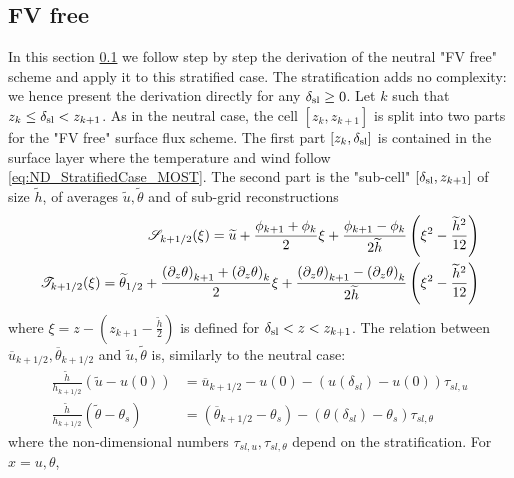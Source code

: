 \subsection{FV free}
\label{sec:ND_StratifiedCase_FVfree}
In this section \ref{sec:ND_StratifiedCase_FVfree} we follow
step by step the derivation of the neutral "FV free" scheme and
apply it to this stratified case. The stratification adds no
complexity: we hence present the derivation directly for
any $\delta_{\rm sl} \geq 0$.
Let $k$ such that $z_k \leq \delta_{\rm sl} < z_{k+1}$.
As in the neutral case, the cell $[z_k, z_{k+1}]$ is split
into two parts for the "FV free" surface flux scheme.
The first part $[z_k,\delta_{\rm sl}]$ is contained
in the surface layer where the temperature and wind
follow \eqref{eq:ND_StratifiedCase_MOST}.
The second part is the
"sub-cell" $[\delta_{\rm sl}, z_{k+1}]$ of size $\widetilde{h}$, of
averages $\widetilde{u}, \widetilde{\theta}$
and of sub-grid reconstructions
\begin{equation}
\begin{aligned}
{\cal S}_{k+1/2}(\xi) = \widetilde{u} +
	\frac{\phi_{k+1} + \phi_{k}}{2} \xi
+ \frac{\phi_{k+1} - \phi_{k}}{2\widetilde{h}}
	\left(\xi^2 - \frac{\widetilde{h}^2}{12}\right) \\
{\cal T}_{k+1/2}(\xi) = \widetilde{\theta}_{1/2} +
	\frac{{(\partial_z \theta)}_{k+1} + 
		{(\partial_z \theta)}_{k}}{2} \xi
+ \frac{{(\partial_z \theta)}_{k+1} - {(\partial_z \theta)}_{k}}
	{2\widetilde{h}}
	\left(\xi^2 - \frac{\widetilde{h}^2}{12}\right)
\end{aligned}
\end{equation}
where $\xi = z - (z_{k+1} - \frac{\widetilde{h}}{2})$ is defined
for $\delta_{\rm sl} < z < z_{k+1}$.
The relation between
$\overline{u}_{k+1/2}, \overline{\theta}_{k+1/2}$ and
$\widetilde{u},\widetilde{\theta}$ is, similarly to the neutral case:
\begin{equation} \label{eq:ND_StratifiedCase_tmprelation_tilde_bar}
\begin{aligned}
	\frac{\widetilde{h}}{h_{k+1/2}} (\widetilde{u}-u(0)) &=
	\overline{u}_{k+1/2}-u(0) - 
	(u(\delta_{sl})-u(0)) \tau_{sl, u}\\
	\frac{\widetilde{h}}{h_{k+1/2}}
	(\widetilde{\theta} - \theta_s) &=
	(\overline{\theta}_{k+1/2}-\theta_s) -
	(\theta(\delta_{sl})-\theta_s)\tau_{sl, \theta}
\end{aligned}
\end{equation}
where the non-dimensional numbers $\tau_{sl, u}, \tau_{sl, \theta}$
depend on the stratification. For $x=u, \theta$,
